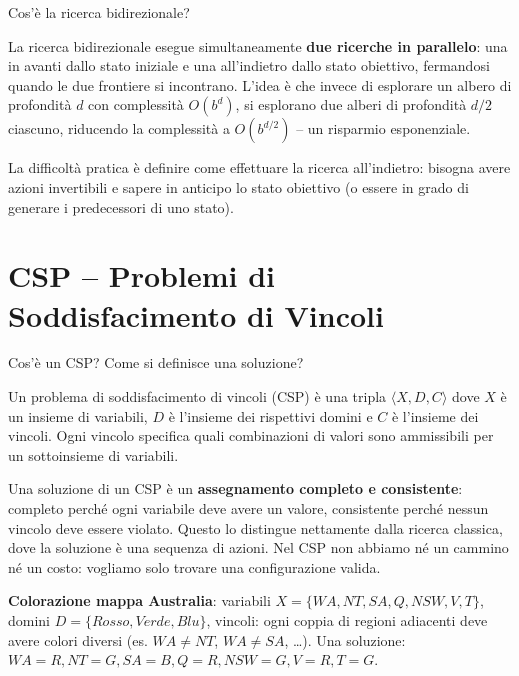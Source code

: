 \documentclass[12pt,a4paper]{article}
\begin{document}
\begin{domandabox}{Cos'è la ricerca bidirezionale?}
\end{domandabox}

La ricerca bidirezionale esegue simultaneamente \textbf{due ricerche in parallelo}: una in avanti dallo stato iniziale e una all'indietro dallo stato obiettivo, fermandosi quando le due frontiere si incontrano. L'idea è che invece di esplorare un albero di profondità $d$ con complessità $O(b^d)$, si esplorano due alberi di profondità $d/2$ ciascuno, riducendo la complessità a $O(b^{d/2})$ -- un risparmio esponenziale.

La difficoltà pratica è definire come effettuare la ricerca all'indietro: bisogna avere azioni invertibili e sapere in anticipo lo stato obiettivo (o essere in grado di generare i predecessori di uno stato).

\section{CSP -- Problemi di Soddisfacimento di Vincoli}

\begin{domandabox}{Cos'è un CSP? Come si definisce una soluzione?}
\end{domandabox}

Un problema di soddisfacimento di vincoli (CSP) è una tripla $\langle X, D, C \rangle$ dove $X$ è un insieme di variabili, $D$ è l'insieme dei rispettivi domini e $C$ è l'insieme dei vincoli. Ogni vincolo specifica quali combinazioni di valori sono ammissibili per un sottoinsieme di variabili.

Una soluzione di un CSP è un \textbf{assegnamento completo e consistente}: completo perché ogni variabile deve avere un valore, consistente perché nessun vincolo deve essere violato. Questo lo distingue nettamente dalla ricerca classica, dove la soluzione è una sequenza di azioni. Nel CSP non abbiamo né un cammino né un costo: vogliamo solo trovare una configurazione valida.

\begin{esempiobox}
\textbf{Colorazione mappa Australia}: variabili $X = \{WA, NT, SA, Q, NSW, V, T\}$, domini $D = \{Rosso, Verde, Blu\}$, vincoli: ogni coppia di regioni adiacenti deve avere colori diversi (es. $WA \neq NT$, $WA \neq SA$, \ldots). Una soluzione: $WA=R, NT=G, SA=B, Q=R, NSW=G, V=R, T=G$.
\end{esempiobox}
\end{document}
